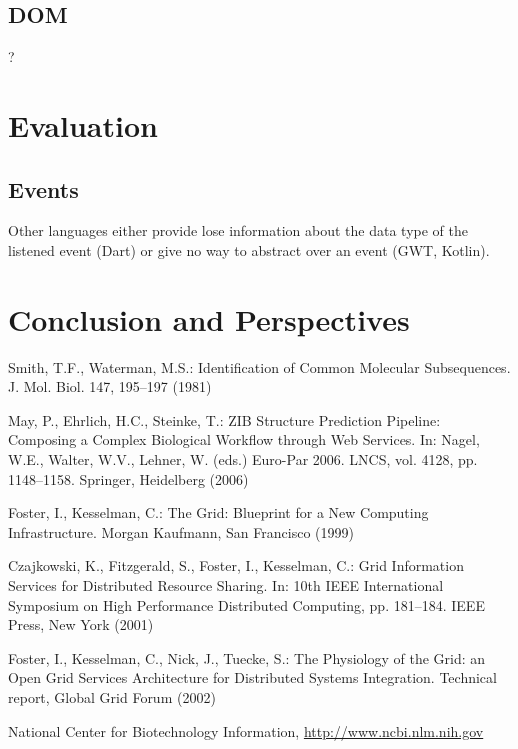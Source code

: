 \documentclass[runningheads,a4paper]{llncs}
\begin{document}
\subsection{DOM}

?

\section{Evaluation}

\subsection{Events}

Other languages either provide lose information about the data type of the listened event (Dart) or give no way to
abstract over an event (GWT, Kotlin).

\section{Conclusion and Perspectives}

\begin{thebibliography}{4}

 Smith, T.F., Waterman, M.S.: Identification of Common Molecular
Subsequences. J. Mol. Biol. 147, 195--197 (1981)

 May, P., Ehrlich, H.C., Steinke, T.: ZIB Structure Prediction Pipeline:
Composing a Complex Biological Workflow through Web Services. In: Nagel,
W.E., Walter, W.V., Lehner, W. (eds.) Euro-Par 2006. LNCS, vol. 4128,
pp. 1148--1158. Springer, Heidelberg (2006)

 Foster, I., Kesselman, C.: The Grid: Blueprint for a New Computing
Infrastructure. Morgan Kaufmann, San Francisco (1999)

 Czajkowski, K., Fitzgerald, S., Foster, I., Kesselman, C.: Grid
Information Services for Distributed Resource Sharing. In: 10th IEEE
International Symposium on High Performance Distributed Computing, pp.
181--184. IEEE Press, New York (2001)

 Foster, I., Kesselman, C., Nick, J., Tuecke, S.: The Physiology of the
Grid: an Open Grid Services Architecture for Distributed Systems
Integration. Technical report, Global Grid Forum (2002)

 National Center for Biotechnology Information, \url{http://www.ncbi.nlm.nih.gov}

\end{thebibliography}
\end{document}
